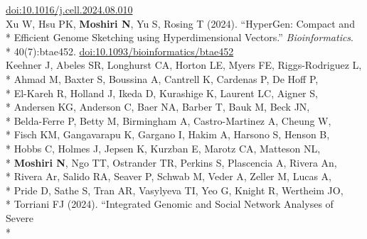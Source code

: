 \documentclass[margin,line]{res}
\begin{document}
\begin{resume}
\hspace*{8mm} \href{https://doi.org/10.1016/j.cell.2024.08.010}{doi:10.1016/j.cell.2024.08.010}\\
\hspace*{4mm} Xu W, Hsu PK, \textbf{Moshiri N}, Yu S, Rosing T (2024). ``HyperGen: Compact and\\*
\hspace*{9.5mm} Efficient Genome Sketching using Hyperdimensional Vectors.'' \textit{Bioinformatics}.\\*\vspace{2mm}
\hspace*{8mm} 40(7):btae452. \href{https://doi.org/10.1093/bioinformatics/btae452}{doi:10.1093/bioinformatics/btae452}\\
\hspace*{4mm} Keehner J, Abeles SR, Longhurst CA, Horton LE, Myers FE, Riggs-Rodriguez L,\\*
\hspace*{9.5mm} Ahmad M, Baxter S, Boussina A, Cantrell K, Cardenas P, De Hoff P,\\*
\hspace*{9.5mm} El-Kareh R, Holland J, Ikeda D, Kurashige K, Laurent LC, Aigner S,\\*
\hspace*{9.5mm} Andersen KG, Anderson C, Baer NA, Barber T, Bauk M, Beck JN,\\*
\hspace*{9.5mm} Belda-Ferre P, Betty M, Birmingham A, Castro-Martinez A, Cheung W,\\*
\hspace*{9.5mm} Fisch KM, Gangavarapu K, Gargano I, Hakim A, Harsono S, Henson B,\\*
\hspace*{9.5mm} Hobbs C, Holmes J, Jepsen K, Kurzban E, Marotz CA, Matteson NL,\\*
\hspace*{9.5mm} \textbf{Moshiri N}, Ngo TT, Ostrander TR, Perkins S, Plascencia A, Rivera An,\\*
\hspace*{9.5mm} Rivera Ar, Salido RA, Seaver P, Schwab M, Veder A, Zeller M, Lucas A,\\*
\hspace*{9.5mm} Pride D, Sathe S, Tran AR, Vasylyeva TI, Yeo G, Knight R, Wertheim JO,\\*
\hspace*{9.5mm} Torriani FJ (2024). ``Integrated Genomic and Social Network Analyses of Severe\\*

\end{resume}
\end{document}
